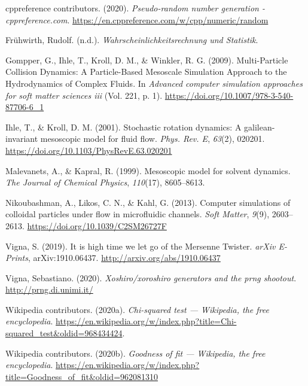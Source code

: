 \documentclass[
]{article}
\newlength{\cslhangindent}
\newenvironment{cslreferences}%
  {\setlength{\parindent}{0pt}%
  \everypar{\setlength{\hangindent}{\cslhangindent}}\ignorespaces}%
  {\par}
\begin{document}
\hypertarget{refs}{}
\begin{cslreferences}
\leavevmode\hypertarget{ref-cppreference:prng}{}%
cppreference contributors. (2020). \emph{Pseudo-random number generation
- cppreference.com}.
\url{https://en.cppreference.com/w/cpp/numeric/random}

\leavevmode\hypertarget{ref-fruehwirthstat}{}%
Frühwirth, Rudolf. (n.d.). \emph{Wahrscheinlichkeitsrechnung und
Statistik}.

\leavevmode\hypertarget{ref-winkl2009}{}%
Gompper, G., Ihle, T., Kroll, D. M., \& Winkler, R. G. (2009).
Multi-Particle Collision Dynamics: A Particle-Based Mesoscale Simulation
Approach to the Hydrodynamics of Complex Fluids. In \emph{Advanced
computer simulation approaches for soft matter sciences iii} (Vol. 221,
p. 1). \url{https://doi.org/10.1007/978-3-540-87706-6_1}

\leavevmode\hypertarget{ref-ihlekroll2001}{}%
Ihle, T., \& Kroll, D. M. (2001). Stochastic rotation dynamics: A
galilean-invariant mesoscopic model for fluid flow. \emph{Phys. Rev. E},
\emph{63}(2), 020201. \url{https://doi.org/10.1103/PhysRevE.63.020201}

\leavevmode\hypertarget{ref-malev1999}{}%
Malevanets, A., \& Kapral, R. (1999). Mesoscopic model for solvent
dynamics. \emph{The Journal of Chemical Physics}, \emph{110}(17),
8605--8613.

\leavevmode\hypertarget{ref-nikoubashman2013}{}%
Nikoubashman, A., Likos, C. N., \& Kahl, G. (2013). Computer simulations
of colloidal particles under flow in microfluidic channels. \emph{Soft
Matter}, \emph{9}(9), 2603--2613.
\url{https://doi.org/10.1039/C2SM26727F}

\leavevmode\hypertarget{ref-vigna2019}{}%
Vigna, S. (2019). It is high time we let go of the Mersenne Twister.
\emph{arXiv E-Prints}, arXiv:1910.06437.
\url{http://arxiv.org/abs/1910.06437}

\leavevmode\hypertarget{ref-unimi:xoshiro}{}%
Vigna, Sebastiano. (2020). \emph{Xoshiro/xoroshiro generators and the
prng shootout}. \url{http://prng.di.unimi.it/}

\leavevmode\hypertarget{ref-wiki:chisquaredtest}{}%
Wikipedia contributors. (2020a). \emph{Chi-squared test --- Wikipedia,
the free encyclopedia}.
\url{https://en.wikipedia.org/w/index.php?title=Chi-squared_test\&oldid=968434424}.

\leavevmode\hypertarget{ref-wiki:goodnessoffit}{}%
Wikipedia contributors. (2020b). \emph{Goodness of fit --- Wikipedia,
the free encyclopedia}.
\url{https://en.wikipedia.org/w/index.php?title=Goodness_of_fit\&oldid=962081310}


\end{cslreferences}
\end{document}
